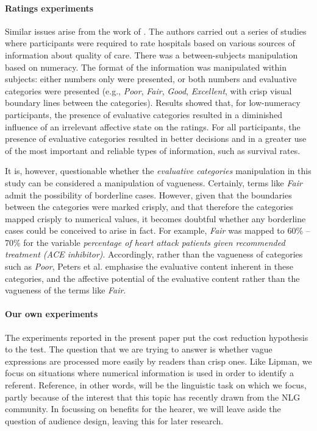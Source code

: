 \documentclass[graybox,envcountchap,sectrefs%
,footinfo
]{svmono}
\begin{document}
\paragraph{Ratings experiments} 
Similar issues arise from the work of \citet{peters2009bringing}. The authors carried out a series of studies where participants were required to rate hospitals based on various sources of information about quality of care. There was a between-subjects manipulation based on numeracy. The format of the information was manipulated within subjects: either numbers only were presented, or both numbers and evaluative categories were presented (e.g., \emph{Poor}, \emph{Fair}, \emph{Good}, \emph{Excellent}, with crisp visual boundary lines between the categories). Results showed that, for low-numeracy participants, the presence of evaluative categories resulted in a diminished influence of an irrelevant affective state on the ratings. For all participants, the presence of evaluative categories resulted in better decisions and in a greater use of the most important and reliable types of information, such as survival rates. 

It is, however, questionable whether the \emph{evaluative categories} manipulation in this study can be considered a manipulation of vagueness. Certainly, terms like \emph{Fair} admit the possibility of borderline cases. However, given that the boundaries between the categories were marked crisply, and that therefore the categories mapped crisply to numerical values, it becomes doubtful whether any borderline cases could be conceived to arise in fact. For example, \emph{Fair} was mapped to 60\% -- 70\% for the variable \emph{percentage of heart attack patients given recommended treatment (ACE inhibitor)}. Accordingly, rather than the vagueness of categories such as \emph{Poor}, Peters et al. emphasise the evaluative content inherent in these categories, and the affective potential of the evaluative content rather than the vagueness of the terms like \emph{Fair}.

\paragraph{Our own experiments}
The experiments reported in the present paper put the cost reduction hypothesis to the test. The question that we are trying to answer is whether vague expressions are processed more easily by readers than crisp ones. Like Lipman, we focus on situations where numerical information is used in order to identify a referent. Reference, in other words, will be the linguistic task on which we focus, partly because of the interest that this topic has recently drawn from the NLG community.  In focussing on benefits for the hearer, we will leave aside the question of audience design, leaving this for later research.
\end{document}
